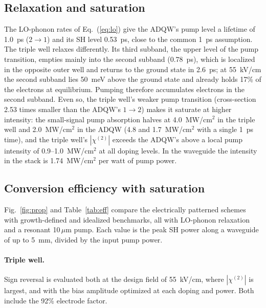 \documentclass[11pt]{article}
\newcommand{\chitwo}{\chi^{(2)}}
\newcommand{\um}{\,\mu\mathrm{m}}
\begin{document}
\subsection{Relaxation and saturation}
The LO-phonon rates of Eq.~(\ref{eq:lo}) give the ADQW's pump level a lifetime of 1.0~ps ($2\to1$) and its SH level 0.53~ps, close to the common 1~ps assumption. The triple well relaxes differently. Its third subband, the upper level of the pump transition, empties mainly into the second subband (0.78~ps), which is localized in the opposite outer well and returns to the ground state in 2.6~ps; at 55~kV/cm the second subband lies 50~meV above the ground state and already holds 17\% of the electrons at equilibrium. Pumping therefore accumulates electrons in the second subband. Even so, the triple well's weaker pump transition (cross-section 2.53 times smaller than the ADQW's $1\to2$) makes it saturate at higher intensity: the small-signal pump absorption halves at 4.0~MW/cm$^2$ in the triple well and 2.0~MW/cm$^2$ in the ADQW (4.8 and 1.7~MW/cm$^2$ with a single 1~ps time), and the triple well's $|\chitwo|$ exceeds the ADQW's above a local pump intensity of 0.9--1.0~MW/cm$^2$ at all doping levels. In the waveguide the intensity in the stack is 1.74~MW/cm$^2$ per watt of pump power.

\subsection{Conversion efficiency with saturation}\label{sec:eff}
Fig.~\ref{fig:prop} and Table~\ref{tab:eff} compare the electrically patterned schemes with growth-defined and idealized benchmarks, all with LO-phonon relaxation and a resonant 10$\um$ pump. Each value is the peak SH power along a waveguide of up to 5~mm, divided by the input pump power.

\paragraph{Triple well.} Sign reversal is evaluated both at the design field of 55~kV/cm, where $|\chitwo|$ is largest, and with the bias amplitude optimized at each doping and power. Both include the 92\% electrode factor.
\end{document}
